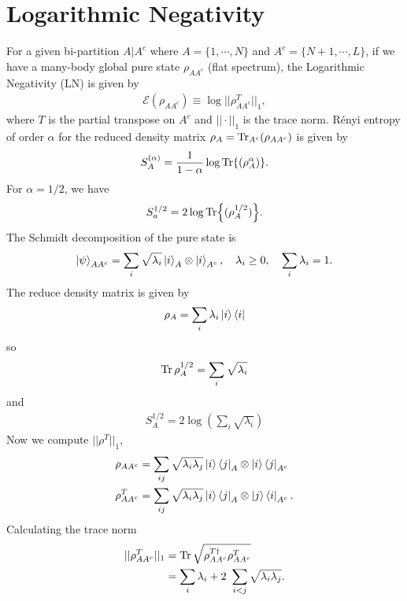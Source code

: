 \section{Logarithmic Negativity}
\label{app:Log-neg}
For a given bi-partition $A|A^c$ where $A=\{1,\cdots,N\}$ and $A^c=\{N+1,\cdots,L\}$, if we have a many-body global pure state $\rho_{AA^c}$ (flat spectrum), the Logarithmic Negativity (LN) is given by 
\begin{align}
    \mathcal{E}(\rho_{AA^c})\equiv\log||\rho_{AA^c}^{T}||_1,
\end{align}
where $T$ is the partial transpose on $A^c$ and $||\cdot||_1$ is the trace norm. Rényi entropy of order $\alpha$ for the reduced density matrix $\rho_A=\Tr_{A^c}(\rho_{AA^c})$ is given by 
\begin{align}
    S_A^{(\alpha)}= \frac{1}{1-\alpha}\log \Tr{(\rho_A^\alpha)}.
\end{align}
For $\alpha=1/2$, we have 
\begin{align}
    S_a^{1/2} = 2\log \Tr{(\rho_A^{1/2})}.
\end{align}
The Schmidt decomposition of the pure state is 
\begin{align}
    \ket{\psi}_{AA^c} = \sum_i\sqrt{\lambda_i}\ket{i}_A \otimes \ket{i}_{A^c},\quad\lambda_i \geq0,\quad\sum_i\lambda_i =1.
\end{align}
The reduce density matrix is given by 
\begin{align}
    \rho_A = \sum_i \lambda_i \ket{i}\bra{i}
\end{align}
so 
\begin{align}
    \Tr\rho_A^{1/2}=\sum_i \sqrt{\lambda_i}
\end{align}
and 
\begin{align}
    S^{1/2}_A = 2 \log \left(\sum_i \sqrt{\lambda_i}\right)
\end{align}
Now we compute $||\rho^T||_1$,
\begin{align}
    \rho_{AA^c}&= \sum_{ij}\sqrt{\lambda_i \lambda_j} \ket{i}\bra{j}_A \otimes \ket{i}\bra{j}_{A^c}\\
    \rho_{AA^c}^T&=\sum_{ij}\sqrt{\lambda_i \lambda_j} \ket{i}\bra{j}_A \otimes \ket{j}\bra{i}_{A^c}.
\end{align}
Calculating the trace norm
\begin{align}
    ||\rho_{AA^c}^T||_1&=\Tr\sqrt{\rho_{AA^c}^{T\dagger}\rho_{AA^c}^T}\\
    &= \sum_i \lambda_i + 2\ \sum_{i<j}\sqrt{\lambda_i \lambda_j}.
\end{align}
